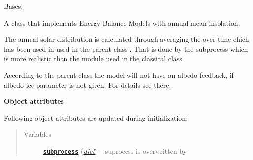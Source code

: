 \documentclass[letterpaper,10pt,english]{sphinxmanual}
\begin{document}
\begin{fulllineitems}
\label{api/climlab.model:climlab.model.ebm.EBM_annual}
Bases: {\hyperref[api/climlab.model:climlab.model.ebm.EBM_seasonal]{\emph{}}}

A class that implements Energy Balance Models with annual mean insolation.

The annual solar distribution is calculated through averaging the 
{\hyperref[api/climlab.radiation:climlab.radiation.insolation.DailyInsolation]{\emph{}}} over time 
ehich has been used in used in the parent class
{\hyperref[api/climlab.model:climlab.model.ebm.EBM_seasonal]{\emph{}}}. That is done by the subprocess
{\hyperref[api/climlab.radiation:climlab.radiation.insolation.AnnualMeanInsolation]{\emph{}}} which is
more realistic than the {\hyperref[api/climlab.radiation:climlab.radiation.insolation.P2Insolation]{\emph{}}}
module used in the classical {\hyperref[api/climlab.model:climlab.model.ebm.EBM]{\emph{}}} class.

According to the parent class {\hyperref[api/climlab.model:climlab.model.ebm.EBM_seasonal]{\emph{}}}
the model will not have an albedo feedback, if albedo ice parameter
 is not given. For details see there.

\textbf{Object attributes}

Following object attributes are updated during initialization:
\begin{quote}\begin{description}
\item[{Variables}] \leavevmode
\href{http://docs.python.org/2.7/library/subprocess.html\#module-subprocess}{\textbf{\texttt{subprocess}}} (\href{http://docs.python.org/2.7/library/stdtypes.html\#dict}{\emph{dict}}) -- suprocess  is overwritten by
{\hyperref[api/climlab.radiation:climlab.radiation.insolation.AnnualMeanInsolation]{\emph{}}}

\end{description}\end{quote}

\end{fulllineitems}

\end{document}
